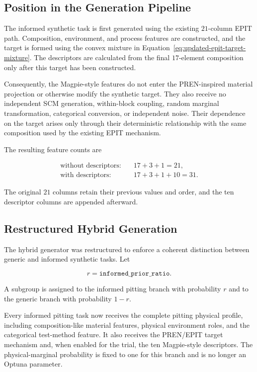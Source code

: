 \documentclass{article}
\begin{document}
\subsection{Position in the Generation Pipeline}

The informed synthetic task is first generated using the existing \(21\)-column
EPIT path. Composition, environment, and process features are constructed, and
the target is formed using the convex mixture in
Equation~\eqref{eq:updated-epit-target-mixture}. The descriptors are calculated
from the final \(17\)-element composition only after this target has been
constructed.

Consequently, the Magpie-style features do not enter the PREN-inspired material
projection or otherwise modify the synthetic target. They also receive no
independent SCM generation, within-block coupling, random marginal
transformation, categorical conversion, or independent noise. Their dependence
on the target arises only through their deterministic relationship with the
same composition used by the existing EPIT mechanism.

The resulting feature counts are

\begin{equation}
\begin{aligned}
\text{without descriptors:}\quad
&17+3+1=21,\\
\text{with descriptors:}\quad
&17+3+1+10=31.
\end{aligned}
\label{eq:magpie-feature-counts}
\end{equation}

The original \(21\) columns retain their previous values and order, and the ten
descriptor columns are appended afterward.

\subsection{Restructured Hybrid Generation}

The hybrid generator was restructured to enforce a coherent distinction between
generic and informed synthetic tasks. Let

\[
r
=
\texttt{informed\_prior\_ratio}.
\]

A subgroup is assigned to the informed pitting branch with probability \(r\)
and to the generic branch with probability \(1-r\).

Every informed pitting task now receives the complete pitting physical profile,
including composition-like material features, physical environment roles, and
the categorical test-method feature. It also receives the PREN/EPIT target
mechanism and, when enabled for the trial, the ten Magpie-style descriptors.
The physical-marginal probability is fixed to one for this branch and is no
longer an Optuna parameter.
\end{document}
